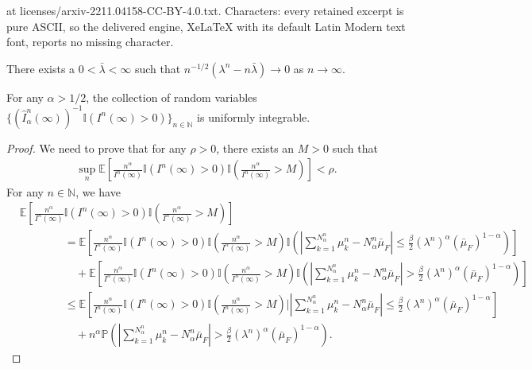 \documentclass[10pt,a4paper]{amsart}
\newcommand{\EE}{\mathbb{E}}
\newcommand{\II}{\mathbb{I}}
\newcommand{\NN}{\mathbb{N}}
\newcommand{\PP}{\mathbb{P}}
\begin{document}
at licenses/arxiv-2211.04158-CC-BY-4.0.txt. Characters: every retained excerpt is pure ASCII, so the delivered engine, XeLaTeX with its default Latin Modern text font, reports no missing character.
\begin{assumption}\label{asm:lambdascaling}
There exists a $0<\bar{\lambda}<\infty$ such that $n^{-1/2}(\lambda^n-n \bar{\lambda})\to 0$ as $n\to \infty$. 
\end{assumption}

\begin{lemma}\label{lem:uniform_integrable_inverse}
For any $\alpha>1/2$, the collection of random variables $\{(\hat{I}_\alpha^n(\infty))^{-1}\II(I^n(\infty)>0)\}_{n\in \NN}$ is uniformly integrable. 
\end{lemma}

\begin{proof}
We need to prove that for any $\rho>0$, there exists an $M>0$ such that 
\begin{align}
\sup_n \EE\left[\frac{n^{\alpha}}{I^n(\infty)}\II(I^n(\infty)>0)\II\left(\frac{n^{\alpha}}{I^n(\infty)}>M\right)\right]<\rho.
\label{eq:uniform_integrability_def}
\end{align}
For any $n\in \NN$, we have 
\begin{align}
    \nonumber&\EE\left[\frac{n^{\alpha}}{I^n(\infty)}\II(I^n(\infty)>0)\II\left(\frac{n^{\alpha}}{I^n(\infty)}>M\right)\right]\\
    \nonumber&\qquad\qquad=\EE\left[\frac{n^{\alpha}}{I^n(\infty)}\II(I^n(\infty)>0)\II\left(\frac{n^{\alpha}}{I^n(\infty)}>M\right)\II\left(\left|\sum_{k=1}^{N^n_\alpha}\mu_k^n-N^n_\alpha\bar{\mu}_F\right|\leq \frac{\beta}{2}(\lambda^n)^\alpha(\bar{\mu}_F)^{1-\alpha}\right)\right]\\
    \nonumber&\qquad\qquad\quad + \EE\left[\frac{n^{\alpha}}{I^n(\infty)}\II(I^n(\infty)>0)\II\left(\frac{n^{\alpha}}{I^n(\infty)}>M\right)\II\left(\left|\sum_{k=1}^{N^n_\alpha}\mu_k^n-N^n_\alpha\bar{\mu}_F\right|> \frac{\beta}{2}(\lambda^n)^\alpha(\bar{\mu}_F)^{1-\alpha}\right)\right]\\
    \nonumber&\qquad\qquad\leq \EE\left[\frac{n^{\alpha}}{I^n(\infty)}\II(I^n(\infty)>0)\II\left(\frac{n^{\alpha}}{I^n(\infty)}>M\right)|\left|\sum_{k=1}^{N^n_\alpha}\mu_k^n-N^n_\alpha\bar{\mu}_F\right|\leq \frac{\beta}{2}(\lambda^n)^\alpha(\bar{\mu}_F)^{1-\alpha}\right]
    \\&\qquad\qquad\quad + n^{\alpha}\PP\left(\left|\sum_{k=1}^{N^n_\alpha}\mu_k^n-N^n_\alpha\bar{\mu}_F\right|> \frac{\beta}{2}(\lambda^n)^\alpha(\bar{\mu}_F)^{1-\alpha}\right).

\end{align}
\end{proof}
\end{document}
